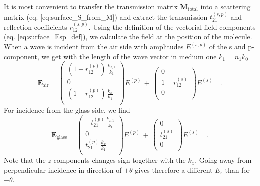 It is most convenient to transfer the transmission matrix $\mathbf{M}_\text{total}$ into a scattering matrix (eq. \ref{eq:surface_S_from_M}) and extract the transmission $t_{21}^{(s,p)}$ and reflection coefficients $r_{12}^{(s,p)}$. Using the definition  of the vectorial field components (eq. \ref{eq:surface_Esp_def}), we calculate  the field at the position of the molecule. When a wave is incident from the air side with amplitudes  $E^{(s,p)}$ of the s and p-component, we get
 with the length of the wave vector in medium one $k_1 = n_1 k_0$
\begin{equation}
  \mathbf{E}_\text{air}=
  \begin{pmatrix}
  \left(1 - r_{12}^{(p)} \right) \,  \frac{ k_{z,1}}{  k_1} \\ 
   0   \\
   \left (1 + r_{12}^{(p)} \right)  \, \frac{ k_{x}}{  k_1}  \\
  \end{pmatrix}
 E^{(p)}
  \, + \, 
  \begin{pmatrix}
   0\\ 
     1 + r_{12}^{(s)}      \\
    0 \\
    \end{pmatrix}
   E^{(s)} \quad . \label{eq:dipole_Esp_air}
  \end{equation}
For incidence from the glass side, we find
\begin{equation}
\mathbf{E}_\text{glass}=
\begin{pmatrix}
- t_{21}^{(p)}  \,  \frac{ k_{z,1}}{  k_1} \\ 
 0  \\ 
  t_{21}^{(p)}   \, \frac{ k_{x}}{  k_1}  \\
\end{pmatrix}
E^{(p)} \, + \, 
\begin{pmatrix}
  0 \\ 
   t_{21} ^{(s)}   \\ 
   0 \\
  \end{pmatrix}
  E^{(s)} \quad . \label{eq:dipole_Esp_glas}
\end{equation}
Note that the $z$ components changes sign together with the $k_x$. Going away from  perpendicular incidence in direction of $+\theta$ gives therefore a different $E_z$ than for $-\theta$.


